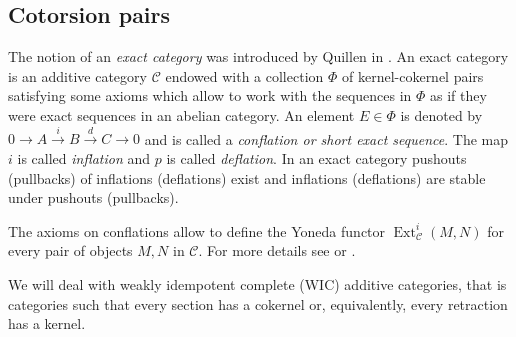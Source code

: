 \documentclass[11pt,a4paper,reqno]{amsart}
\newcommand{\Ext}{\operatorname{Ext}}
\newcommand{\C}{\mathcal{C}}
\theoremstyle{plain}
\theoremstyle{definition}
\theoremstyle{remark}
\begin{document}
\subsection{Cotorsion pairs}\label{S:cot-pair}

The notion of an \emph{exact category} was introduced by Quillen in \cite{Q}.
 An exact category is an additive category  $\C$ endowed with  a collection $\Phi$ of kernel-cokernel pairs  satisfying some axioms which allow to work with the sequences  in $\Phi$ as if they were exact sequences in an abelian category. An element $E\in \Phi$ is denoted by $0\to A\overset{i}\to B\overset{d}\to C\to 0$ and is called a \emph{conflation or short exact sequence}. The map $i$ is called \emph{inflation} and $p$ is called \emph{deflation}.
In an exact category pushouts (pullbacks) of inflations (deflations) exist and inflations (deflations) are stable under pushouts (pullbacks).

The axioms on conflations allow to define the Yoneda functor $\Ext^i_{\C}(M,N)$ for every pair of objects $M,N$
 in $\C$.
For more details see \cite{Kel90} or \cite{Bu}.

We will deal with weakly idempotent complete (WIC) additive categories, that is categories such that every section has a cokernel or, equivalently, every retraction has a kernel.
\end{document}
